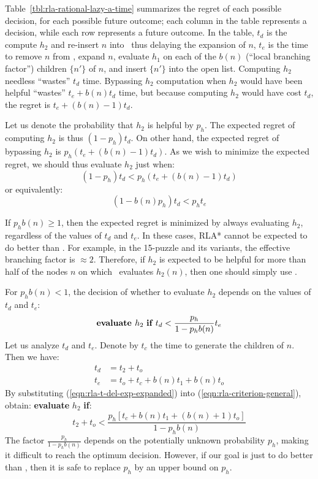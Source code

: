Table~\ref{tbl:rla-rational-lazy-a-time}
summarizes the regret of each possible decision, for each possible future
outcome; each column in the table represents a decision, while each row
represents a future outcome.
In the table, $t_d$ is the  compute $h_2$ and re-insert $n$ into
\OPEN~thus delaying the expansion of $n$, $t_e$ is the time to remove $n$ from \OPEN,
expand $n$, evaluate $h_1$ on each of the $b(n)$ (``local branching factor'')
children $\{n'\}$ of $n$, and insert $\{n'\}$ into the open list.
Computing $h_2$ needless ``wastes'' $t_d$ time.
Bypassing $h_2$ computation when $h_2$ would have been helpful ``wastes''
$t_e+b(n)t_d$ time, but because computing $h_2$ would have cost $t_d$, the
regret is $t_e+(b(n)-1)t_d$.

Let us denote the probability that $h_2$ is helpful by
$p_h$. The expected regret of computing $h_2$ is thus $(1-p_h) t_d$.
On other hand, the expected regret of bypassing $h_2$ is $p_h(
t_e+(b(n)-1)t_d)$. As we wish to minimize the expected regret, we should thus evaluate $h_2$ just when:
\begin{equation}
(1-p_h) t_d < p_h (t_e+(b(n)-1)t_d)
\end{equation}
or equivalently:
\begin{equation}
(1-b(n) p_h) t_d < p_h t_e
\end{equation}

If $p_h b(n) \ge 1$, then the expected regret is minimized by always
evaluating $h_2$, regardless of the values of $t_d$ and $t_e$.  In
these cases, RLA* cannot be expected to do better than \lazyastar.
For example, in the 15-puzzle and its variants, the effective
branching factor is $\approx 2$. Therefore, if $h_2$ is expected to be
helpful for more than half of the nodes $n$ on which
\lazyastar~evaluates $h_2(n)$, then one should simply use \lazyastar.

For $p_h b(n) < 1$,  the decision of whether to evaluate $h_2$
depends on the values of $t_d$ and $t_e$:
\begin{equation}
\mbox{\bf evaluate }h_2\mbox{ \bf if }t_d<\frac {p_h} {1-p_hb(n)} t_e
\label{eqn:rla-criterion-general}
\end{equation}
Let us analyze $t_d$ and $t_e$. Denote by
$t_c$ the time to generate the children of $n$. Then we have:
\begin{align}
t_d&=t_2+t_o\nonumber\\
t_e&=t_o + t_c+b (n) t_1 + b(n) t_o
\label{eqn:rla-t-del-exp-expanded}
\end{align}
By substituting
(\ref{eqn:rla-t-del-exp-expanded}) into (\ref{eqn:rla-criterion-general}), obtain: {\bf evaluate} $h_2$ {\bf if}:
\begin{equation}
{t_2+t_o}<\frac {p_h \left[{t_c} + b (n)t_1+(b(n)+1){t_o}\right]} {1-p_hb(n)}
\label{eqn:rla-criterion-expanded}
\end{equation}
The factor $\frac {p_h} {1-p_hb(n)}$ depends on the potentially unknown
probability $p_h$, making it difficult to reach the optimum decision.
However, if our goal is just to do better than \lazyastar, then it is safe to replace $p_h$ by an upper bound on $p_h$.

